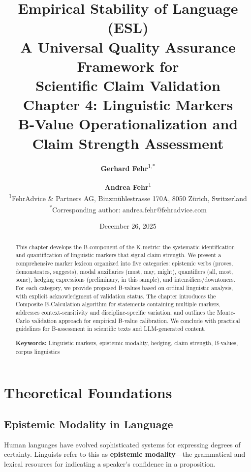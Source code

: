 \documentclass[11pt,a4paper]{article}
\title{%
    \Large \textbf{Empirical Stability of Language (ESL)} \\[0.5em]
    \large A Universal Quality Assurance Framework for \\
    Scientific Claim Validation \\[1em]
    \LARGE \textbf{Chapter 4: Linguistic Markers} \\[0.3em]
    \large B-Value Operationalization and Claim Strength Assessment
}
\author{%
    \textbf{Gerhard Fehr}\textsuperscript{1,*} \and \textbf{Andrea Fehr}\textsuperscript{1} \\[0.5em]
    \textsuperscript{1}FehrAdvice \& Partners AG, Binzmühlestrasse 170A, 8050 Zürich, Switzerland \\[0.3em]
    \textsuperscript{*}Corresponding author: andrea.fehr@fehradvice.com
}
\date{December 26, 2025}
\theoremstyle{remark}
\begin{document}
\maketitle


\begin{abstract}
\noindent
This chapter develops the B-component of the K-metric: the systematic identification and quantification of linguistic markers that signal claim strength. We present a comprehensive marker lexicon organized into five categories: epistemic verbs (proves, demonstrates, suggests), modal auxiliaries (must, may, might), quantifiers (all, most, some), hedging expressions (preliminary, in this sample), and intensifiers/downtoners. For each category, we provide proposed B-values based on ordinal linguistic analysis, with explicit acknowledgment of validation status. The chapter introduces the Composite B-Calculation algorithm for statements containing multiple markers, addresses context-sensitivity and discipline-specific variation, and outlines the Monte-Carlo validation approach for empirical B-value calibration. We conclude with practical guidelines for B-assessment in scientific texts and LLM-generated content.

\vspace{0.5em}
\noindent\textbf{Keywords:} Linguistic markers, epistemic modality, hedging, claim strength, B-values, corpus linguistics
\end{abstract}

\tableofcontents
\newpage


\section{Theoretical Foundations}
\label{sec:foundations}

\subsection{Epistemic Modality in Language}

Human languages have evolved sophisticated systems for expressing degrees of certainty. Linguists refer to this as \textbf{epistemic modality}---the grammatical and lexical resources for indicating a speaker's confidence in a proposition.
\end{document}
